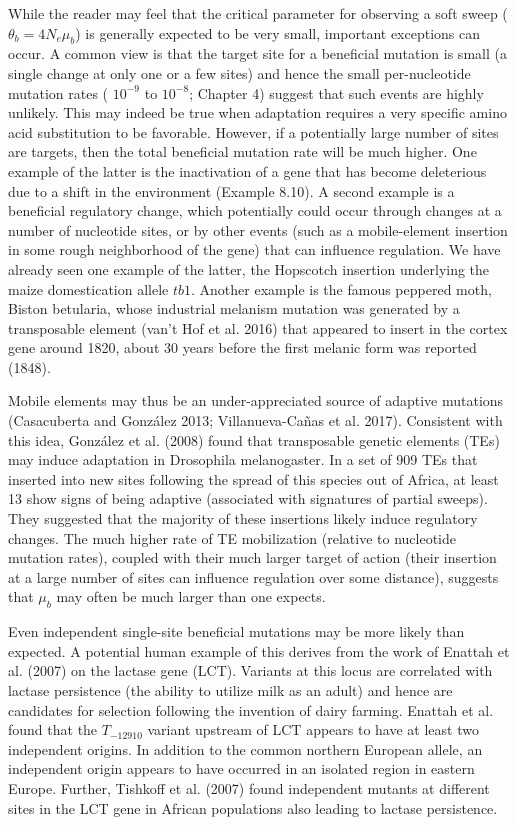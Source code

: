 \documentclass{article}
\begin{document}
While the reader may feel that the critical parameter for observing a soft sweep ( $ \theta_b = 4N_e\mu_b $) is generally expected to be very small, important exceptions can occur. A common view is that the target site for a beneficial mutation is small (a single change at only one or a few sites) and hence the small per-nucleotide mutation rates ( $ 10^{-9} $ to  $ 10^{-8} $; Chapter 4) suggest that such events are highly unlikely. This may indeed be true when adaptation requires a very specific amino acid substitution to be favorable. However, if a potentially large number of sites are targets, then the total beneficial mutation rate will be much higher. One example of the latter is the inactivation of a gene that has become deleterious due to a shift in the environment (Example 8.10). A second example is a beneficial regulatory change, which potentially could occur through changes at a number of nucleotide sites, or by other events (such as a mobile-element insertion in some rough neighborhood of the gene) that can influence regulation. We have already seen one example of the latter, the Hopscotch insertion underlying the maize domestication allele  $ tb1 $. Another example is the famous peppered moth, Biston betularia, whose industrial melanism mutation was generated by a transposable element (van't Hof et al. 2016) that appeared to insert in the cortex gene around 1820, about 30 years before the first melanic form was reported (1848).

Mobile elements may thus be an under-appreciated source of adaptive mutations (Casacuberta and González 2013; Villanueva-Cañas et al. 2017). Consistent with this idea, González et al. (2008) found that transposable genetic elements (TEs) may induce adaptation in Drosophila melanogaster. In a set of 909 TEs that inserted into new sites following the spread of this species out of Africa, at least 13 show signs of being adaptive (associated with signatures of partial sweeps). They suggested that the majority of these insertions likely induce regulatory changes. The much higher rate of TE mobilization (relative to nucleotide mutation rates), coupled with their much larger target of action (their insertion at a large number of sites can influence regulation over some distance), suggests that  $ \mu_{b} $ may often be much larger than one expects.

Even independent single-site beneficial mutations may be more likely than expected. A potential human example of this derives from the work of Enattah et al. (2007) on the lactase gene (LCT). Variants at this locus are correlated with lactase persistence (the ability to utilize milk as an adult) and hence are candidates for selection following the invention of dairy farming. Enattah et al. found that the  $ T_{-12910} $ variant upstream of LCT appears to have at least two independent origins. In addition to the common northern European allele, an independent origin appears to have occurred in an isolated region in eastern Europe. Further, Tishkoff et al. (2007) found independent mutants at different sites in the LCT gene in African populations also leading to lactase persistence.
\end{document}
